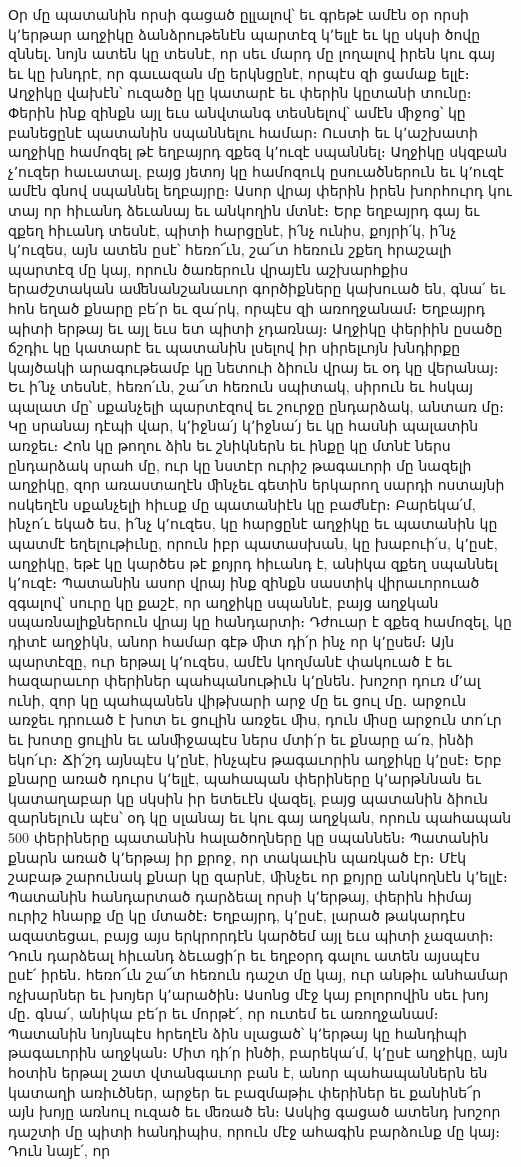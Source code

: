 \documentclass{article}
\begin{document}
{Օր մը պատանին որսի գացած ըլլալով՝ եւ գրեթէ ամէն օր որսի կ՚երթար աղջիկը ձանձրութենէն պարտէզ կ՚ելլէ եւ կը սկսի ծովը զննել․ նոյն ատեն կը տեսնէ, որ սեւ մարդ մը լողալով իրեն կու գայ եւ կը խնդրէ, որ գաւազան մը երկնցընէ, որպէս զի ցամաք ելլէ։ Աղջիկը վախէն՝ ուզածը կը կատարէ եւ փերին կըտանի տունը։ Փերին ինք զինքն այլ եւս անվտանգ տեսնելով՝ ամէն ﬕջոց՝ կը բանեցընէ պատանին սպաննելու համար։ Ուստի եւ կ՚աշխատի աղջիկը համոզել թէ եղբայրդ զքեզ կ՚ուզէ սպաննել։ Աղջիկը սկզբան չ՚ուզեր հաւատալ, բայց յետոյ կը համոզուկ ըսուածներուն եւ կ՚ուզէ ամէն գնով սպաննել եղբայրը։ Ասոր վրայ փերին իրեն խորհուրդ կու տայ որ հիւանդ ձեւանայ եւ անկողին մտնէ։ Երբ եղբայրդ գայ եւ զքեղ հիւանդ տեսնէ, պիտի հարցընէ, ի՛նչ ունիս, քոյրի՛կ, ի՛նչ կ՚ուզես, այն ատեն ըսէ՝ հեռո՜ւն, շա՜տ հեռուն շքեղ հրաշալի պարտէզ մը կայ, որուն ծառերուն վրայէն աշխարհքիս երաժշտական աﬔնանշանաւոր գործիքները կախուած են, գնա՛ եւ հոն եղած քնարը բե՛ր եւ զա՛րկ, որպէս զի առողջանամ։ Եղբայրդ պիտի երթայ եւ այլ եւս ետ պիտի չդառնայ։ Աղջիկը փերիին ըսածը ճշդիւ կը կատարէ եւ պատանին լսելով իր սիրելւոյն խնդիրքը կայծակի արագութեամբ կը նետուի ձիուն վրայ եւ օդ կը վերանայ։ Եւ ի՛նչ տեսնէ, հեռո՛ւն, շա՜տ հեռուն սպիտակ, սիրուն եւ հսկայ պալատ մը՝ սքանչելի պարտէզով եւ շուրջը ընդարձակ, անտառ մը։ Կը սրանայ դէպի վար, կ՚իջնա՛յ կ՚իջնա՛յ եւ կը հասնի պալատին առջեւ։ Հոն կը թողու ձին եւ շնիկներն եւ ինքը կը մտնէ ներս ընդարձակ սրահ մը, ուր կը նստէր ուրիշ թագաւորի մը նազելի աղջիկը, զոր առաստաղէն ﬕնչեւ գետին երկարող սարդի ոստայնի ոսկեղէն սքանչելի հիւսք մը պատանիէն կը բաժնէր։ Բարեկա՛մ, ինչո՛ւ եկած ես, ի՛նչ կ՚ուզես, կը հարցընէ աղջիկը եւ պատանին կը պատմէ եղելութիւնը, որուն իբր պատասխան, կը խաբուի՛ս, կ՚ըսէ, աղջիկը, եթէ կը կարծես թէ քոյրդ հիւանդ է, անիկա զքեղ սպաննել կ՚ուզէ։ Պատանին ասոր վրայ ինք զինքն սաստիկ վիրաւորուած զգալով՝ սուրը կը քաշէ, որ աղջիկը սպաննէ, բայց աղջկան սպառնալիքներուն վրայ կը հանդարտի։ Դժուար է զքեզ համոզել, կը դիտէ աղջիկն, անոր համար գէթ ﬕտ դի՛ր ինչ որ կ՚ըսեմ։ Այն պարտէզը, ուր երթալ կ՚ուզես, ամէն կողմանէ փակուած է եւ հազարաւոր փերիներ պահպանութիւն կ՚ընեն․ խոշոր դուռ մ՚ալ ունի, զոր կը պահպանեն վիթխարի արջ մը եւ ցուլ մը․ արջուն առջեւ դրուած է խոտ եւ ցուլին առջեւ ﬕս, դուն ﬕսը արջուն տո՛ւր եւ խոտը ցուլին եւ անﬕջապէս ներս մտի՛ր եւ քնարը ա՛ռ, ինձի եկո՛ւր։ Ճի՛շդ այնպէս կ՚ընէ, ինչպէս թագաւորին աղջիկը կ՚ըսէ։ Երբ քնարը առած դուրս կ՚ելլէ, պահապան փերիները կ՚արթննան եւ կատաղաբար կը սկսին իր ետեւէն վազել, բայց պատանին ձիուն զարնելուն պէս՝ օդ կը սլանայ եւ կու գայ աղջկան, որուն պահապան 500 փերիները պատանին հալածողները կը սպաննեն։ Պատանին քնարն առած կ՚երթայ իր քրոջ, որ տակաւին պառկած էր։ Մէկ շաբաթ շարունակ քնար կը զարնէ, ﬕնչեւ որ քոյրը անկողնէն կ՚ելլէ։ Պատանին հանդարտած դարձեալ որսի կ՚երթայ, փերին հիմայ ուրիշ հնարք մը կը մտածէ։ Եղբայրդ, կ՚ըսէ, լարած թակարդէս ազատեցաւ, բայց այս երկրորդէն կարծեմ այլ եւս պիտի չազատի։ Դուն դարձեալ հիւանդ ձեւացի՛ր եւ եղբօրդ գալու ատեն այսպէս ըսէ՛ իրեն․ հեռո՜ւն շա՜տ հեռուն դաշտ մը կայ, ուր անթիւ անհամար ոչխարներ եւ խոյեր կ՚արածին։ Ասոնց մէջ կայ բոլորովին սեւ խոյ մը․ գնա՛, անիկա բե՛ր եւ մորթէ՛, որ ուտեմ եւ առողջանամ։ Պատանին նոյնպէս հրեղէն ձին սլացած՝ կ՚երթայ կը հանդիպի թագաւորին աղջկան։ Միտ դի՛ր ինծի, բարեկա՛մ, կ՚ըսէ աղջիկը, այն հօտին երթալ շատ վտանգաւոր բան է, անոր պահապաններն են կատաղի առիւծներ, արջեր եւ բազմաթիւ փերիներ եւ քանինե՜ր այն խոյը առնուլ ուզած եւ ﬔռած են։ Ասկից գացած ատենդ խոշոր դաշտի մը պիտի հանդիպիս, որուն մէջ ահագին բարձունք մը կայ։ Դուն նայէ՛, որ }
\end{document}
